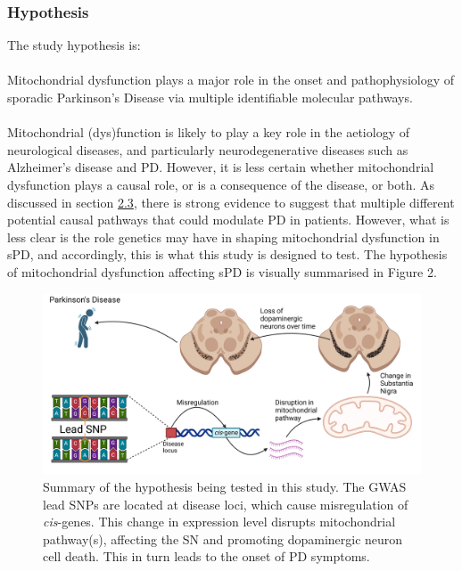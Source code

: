 \documentclass{article}
\begin{document}
\subsubsection{Hypothesis}
\label{subsubsec:hypothesis}
The study hypothesis is:
\\
\\
Mitochondrial dysfunction plays a major role in the onset and pathophysiology of sporadic Parkinson’s Disease via multiple identifiable molecular pathways.
\\
\\Mitochondrial (dys)function is likely to play a key role in the aetiology of neurological diseases\cite{Bartman2024MitochondrialDiseases}, and particularly neurodegenerative diseases such as Alzheimer's disease and PD\cite{MonzioCompagnoni2020TheDisease}. However, it is less certain whether mitochondrial dysfunction plays a causal role, or is a consequence of the disease, or both. As discussed in section \hyperref[subsubsec:mitochondria]{2.3}, there is strong evidence to suggest that multiple different potential causal pathways that could modulate PD in patients. However, what is less clear is the role genetics may have in shaping mitochondrial dysfunction in sPD, and accordingly, this is what this study is designed to test. The hypothesis of mitochondrial dysfunction affecting sPD is visually summarised in Figure 2.
\begin{figure}[h]
    \centering
    \includegraphics[width=1\linewidth]{Thesis/thesis images/Visualhypothesis.png}
    \caption{Summary of the hypothesis being tested in this study. The GWAS lead SNPs are located at disease loci, which cause misregulation of \textit{cis}-genes. This change in expression level disrupts mitochondrial pathway(s), affecting the SN and promoting dopaminergic neuron cell death. This in turn leads to the onset of PD symptoms.}
    \label{fig:enter-label}
\end{figure}
\end{document}
